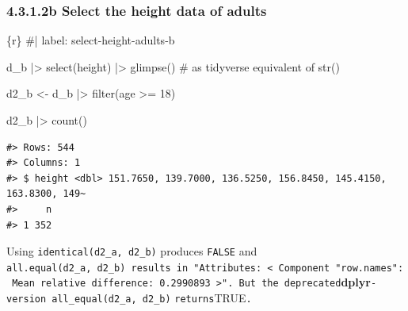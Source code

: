 \documentclass[
  letterpaper,
  DIV=11,
  numbers=noendperiod]{scrreprt}
\newenvironment{Shaded}{\begin{snugshade}}{\end{snugshade}}
\newcommand{\CommentTok}[1]{\textcolor[rgb]{0.37,0.37,0.37}{#1}}
\newcommand{\DecValTok}[1]{\textcolor[rgb]{0.68,0.00,0.00}{#1}}
\newcommand{\FunctionTok}[1]{\textcolor[rgb]{0.28,0.35,0.67}{#1}}
\newcommand{\InformationTok}[1]{\textcolor[rgb]{0.37,0.37,0.37}{#1}}
\newcommand{\NormalTok}[1]{\textcolor[rgb]{0.00,0.23,0.31}{#1}}
\newcommand{\OtherTok}[1]{\textcolor[rgb]{0.00,0.23,0.31}{#1}}
\newcommand{\SpecialCharTok}[1]{\textcolor[rgb]{0.37,0.37,0.37}{#1}}
\begin{document}
\hypertarget{b-select-the-height-data-of-adults}{%
\subsubsection{4.3.1.2b Select the height data of
adults}\label{b-select-the-height-data-of-adults}}

\begin{Shaded}
\begin{Highlighting}[]
\InformationTok{\textasciigrave{}\textasciigrave{}\textasciigrave{}\{r\}}
\CommentTok{\#| label: select{-}height{-}adults{-}b}

\NormalTok{d\_b }\SpecialCharTok{|\textgreater{}} 
    \FunctionTok{select}\NormalTok{(height) }\SpecialCharTok{|\textgreater{}} 
    \FunctionTok{glimpse}\NormalTok{() }\CommentTok{\# as tidyverse equivalent of \textasciigrave{}str()\textasciigrave{}}

\NormalTok{d2\_b }\OtherTok{\textless{}{-}} 
\NormalTok{    d\_b }\SpecialCharTok{|\textgreater{}} 
    \FunctionTok{filter}\NormalTok{(age }\SpecialCharTok{\textgreater{}=} \DecValTok{18}\NormalTok{)}

\NormalTok{d2\_b }\SpecialCharTok{|\textgreater{}} 
    \FunctionTok{count}\NormalTok{()}
\InformationTok{\textasciigrave{}\textasciigrave{}\textasciigrave{}}
\end{Highlighting}
\end{Shaded}

\begin{verbatim}
#> Rows: 544
#> Columns: 1
#> $ height <dbl> 151.7650, 139.7000, 136.5250, 156.8450, 145.4150, 163.8300, 149~
#>     n
#> 1 352
\end{verbatim}

\begin{tcolorbox}[enhanced jigsaw, colframe=quarto-callout-caution-color-frame, colback=white, toprule=.15mm, breakable, arc=.35mm, bottomtitle=1mm, colbacktitle=quarto-callout-caution-color!10!white, toptitle=1mm, titlerule=0mm, title=\textcolor{quarto-callout-caution-color}{\faFire}\hspace{0.5em}{Identical?}, leftrule=.75mm, opacityback=0, rightrule=.15mm, opacitybacktitle=0.6, bottomrule=.15mm, left=2mm, coltitle=black]

Using \texttt{identical(d2\_a,\ d2\_b)} produces \texttt{FALSE} and
\texttt{all.equal(d2\_a,\ d2\_b)\ results\ in\ "Attributes:\ \textless{}\ Component\ "row.names":\ Mean\ relative\ difference:\ 0.2990893\ \textgreater{}".\ But\ the\ deprecated}\textbf{dplyr}\texttt{-version\ all\_equal(d2\_a,\ d2\_b)}
\texttt{returns}TRUE\texttt{.}

\end{tcolorbox}
\end{document}
